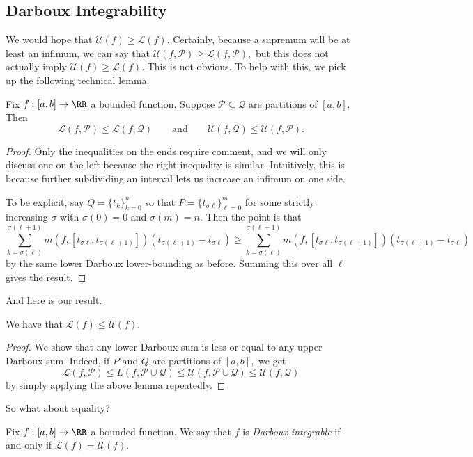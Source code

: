 \subsection{Darboux Integrability}
We would hope that $\mathcal U(f)\ge\mathcal L(f).$ Certainly, because a supremum will be at least an infimum, we can say that $\mathcal U(f,\mathcal P)\ge\mathcal L(f,\mathcal P),$ but this does not actually imply $\mathcal U(f)\ge\mathcal L(f).$ This is not obvious. To help with this, we pick up the following technical lemma.
\begin{lemma}
	Fix $f:[a,b]\to\RR$ a bounded function. Suppose $\mathcal P\subseteq\mathcal Q$ are partitions of $[a,b].$ Then
	\[\mathcal L(f,\mathcal P)\le\mathcal L(f,\mathcal Q)\qquad\text{and}\qquad\mathcal U(f,\mathcal Q)\le\mathcal U(f,\mathcal P).\]
\end{lemma}
\begin{proof}
	Only the inequalities on the ends require comment, and we will only discuss one on the left because the right inequality is similar. Intuitively, this is because further subdividing an interval lets us increase an infimum on one side.

	To be explicit, say $Q=\{t_k\}_{k=0}^n$ so that $P=\{t_{\sigma\ell}\}_{\ell=0}^m$ for some strictly increasing $\sigma$ with $\sigma(0)=0$ and $\sigma(m)=n.$ Then the point is that
	\[\sum_{k=\sigma(\ell)}^{\sigma(\ell+1)}m(f,[t_{\sigma\ell},t_{\sigma(\ell+1)}])(t_{\sigma(\ell+1)}-t_{\sigma\ell})\ge\sum_{k=\sigma(\ell)}^{\sigma(\ell+1)}m(f,[t_{\sigma\ell},t_{\sigma(\ell+1)}])(t_{\sigma(\ell+1)}-t_{\sigma\ell})\]
	by the same lower Darboux lower-bounding as before. Summing this over all $\ell$ gives the result.
\end{proof}
And here is our result.
\begin{proposition}
	We have that $\mathcal L(f)\le\mathcal U(f).$
\end{proposition}
\begin{proof}
	We show that any lower Darboux sum is less or equal to any upper Darboux sum. Indeed, if $P$ and $Q$ are partitions of $[a,b],$ we get
	\[\mathcal L(f,\mathcal P)\le L(f,\mathcal P\cup\mathcal Q)\le\mathcal U(f,\mathcal P\cup\mathcal Q)\le\mathcal U(f,\mathcal Q)\]
	by simply applying the above lemma repeatedly.
\end{proof}
So what about equality?
\begin{definition}[Integrable]
	Fix $f:[a,b]\to\RR$ a bounded function. We say that $f$ is \textit{Darboux integrable} if and only if $\mathcal L(f)=\mathcal U(f).$
\end{definition}
